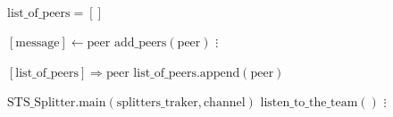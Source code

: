 \documentclass{article}
\begin{document}
\pagestyle{empty}

\newcommand{\send}{\Rightarrow}
\newcommand{\sendto}{\rightarrow}
\newcommand{\recv}{\Leftarrow}
\algrenewcommand\textproc{\textrm}

\begin{algorithmic}

  \algrenewcommand{}
  
  \algrenewcommand{}

  \State $\text{list\_of\_peers}=[]$
  
  \State $[\text{message}] \leftarrow \text{peer}$
  \State $\text{add\_peers}(\text{peer})$
  \EndIf
  \State $\vdots$
  \EndWhile
  \EndProcedure

  \State $[\text{list\_of\_peers}] \send \text{peer}$
  \State $\text{list\_of\_peers}.\text{append}(\text{peer})$
  \EndFunction

  \State $\text{STS\_Splitter}.\text{main}(\text{splitters\_traker},\text{channel})$
  \State $\text{listen\_to\_the\_team}()$
  \State $\vdots$
  \EndFunction
 
  \EndProcedure
  
\end{algorithmic}
\end{document}
